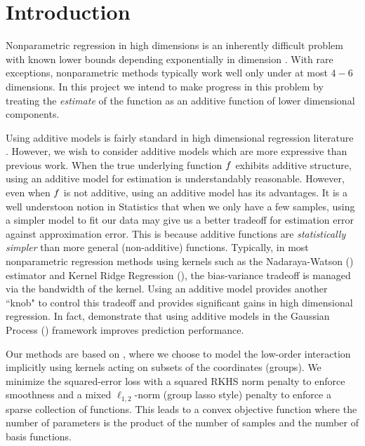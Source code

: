 

\section{Introduction}

Nonparametric regression in high dimensions is an inherently difficult problem with known
lower bounds depending exponentially in dimension
\citep{gyorfi02distributionfree}. 
With rare exceptions,
nonparametric methods typically work well only under at most $4-6$ dimensions.
In this project we intend to make progress in this problem by treating the
\emph{estimate} of the function as
an additive function of lower dimensional components.

Using additive models is fairly standard in high dimensional regression
literature
\cite{hastie90gam,ravikumar09spam,lafferty05rodeo}. 
However, we wish to consider additive models which are more expressive than
previous work.
When the true underlying function $f$ exhibits additive structure, using an additive
model for estimation is understandably reasonable. However, even when $f$ is
not additive, using an additive model has its advantages. 
It is a well understoon notion in Statistics that when we only have a few samples, using a
simpler model to fit our data may give us a better tradeoff for estimation error  
against approximation error. 
This is because additive functions are \emph{statistically simpler}
than more general (non-additive) functions.
Typically, in most nonparametric regression methods using kernels such as the
Nadaraya-Watson
(\nw) estimator and Kernel Ridge Regression (\krr), the bias-variance tradeoff
is managed via the bandwidth of the kernel. 
Using an additive model
provides another ``knob" to control this tradeoff and provides significant gains
in high dimensional regression. In fact, \citet{duvenaud11additivegps}
demonstrate that using additive models in the Gaussian Process (\gp) framework
improves prediction performance.

Our methods are based on \krr, where
we choose to model the low-order interaction implicitly using kernels acting on
subsets of the coordinates (groups).
We minimize the squared-error loss with 
a squared RKHS norm penalty to enforce smoothness
and a mixed $\ell_{1,2}$-norm (group lasso style) penalty 
to enforce a sparse collection of functions.
This leads to a convex objective function where the number of parameters is
the product of the number of samples and the number of basis functions.

